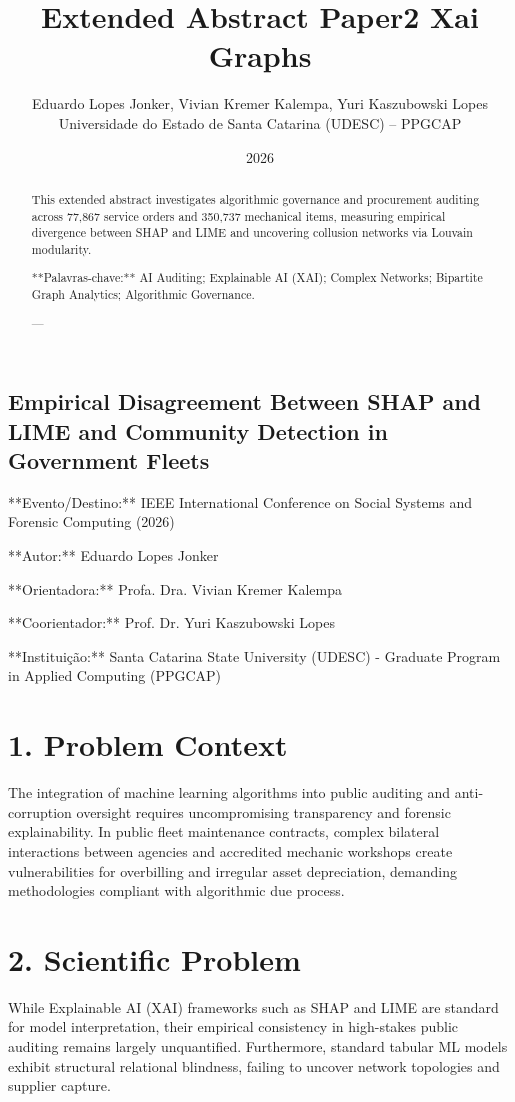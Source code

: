 \documentclass[10pt,a4paper,journal]{article}
\title{Extended Abstract Paper2 Xai Graphs}
\author{Eduardo Lopes Jonker, Vivian Kremer Kalempa, Yuri Kaszubowski Lopes\\ \small Universidade do Estado de Santa Catarina (UDESC) -- PPGCAP}
\date{2026}
\begin{document}
\maketitle

\subsection{Empirical Disagreement Between SHAP and LIME and Community Detection in Government Fleets}
**Evento/Destino:** IEEE International Conference on Social Systems and Forensic Computing (2026)

**Autor:** Eduardo Lopes Jonker

**Orientadora:** Profa. Dra. Vivian Kremer Kalempa

**Coorientador:** Prof. Dr. Yuri Kaszubowski Lopes

**Instituição:** Santa Catarina State University (UDESC) - Graduate Program in Applied Computing (PPGCAP)

\begin{abstract}
This extended abstract investigates algorithmic governance and procurement auditing across 77,867 service orders and 350,737 mechanical items, measuring empirical divergence between SHAP and LIME and uncovering collusion networks via Louvain modularity.

**Palavras-chave:** AI Auditing; Explainable AI (XAI); Complex Networks; Bipartite Graph Analytics; Algorithmic Governance.

---

\end{abstract}

\section{1. Problem Context}
The integration of machine learning algorithms into public auditing and anti-corruption oversight requires uncompromising transparency and forensic explainability. In public fleet maintenance contracts, complex bilateral interactions between agencies and accredited mechanic workshops create vulnerabilities for overbilling and irregular asset depreciation, demanding methodologies compliant with algorithmic due process.

\section{2. Scientific Problem}
While Explainable AI (XAI) frameworks such as SHAP and LIME are standard for model interpretation, their empirical consistency in high-stakes public auditing remains largely unquantified. Furthermore, standard tabular ML models exhibit structural relational blindness, failing to uncover network topologies and supplier capture.
\end{document}
